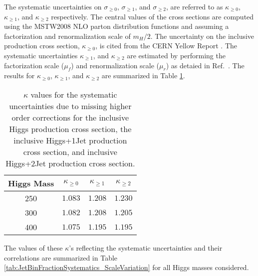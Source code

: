 The systematic uncertainties on $\sigma_{\geq 0}$, $\sigma_{\geq 1}$, and $\sigma_{\geq 2}$, are referred 
to as $\kappa_{\geq 0}$, $\kappa_{\geq 1}$, and $\kappa_{\geq 2}$ respectively. 
The central values of the cross sections are computed  using the MSTW2008 NLO parton distribution functions and 
assuming a factorization and renormalization scale of $m_{H} / 2$. The uncertainty on the inclusive
production cross section, $\kappa_{\geq 0}$, is cited from the CERN Yellow Report 
\cite{LHCHiggsCrossSectionWorkingGroup:2011ti}.  The systematic uncertainties
$\kappa_{\geq 1}$, and $\kappa_{\geq 2}$ are estimated by performing the factorization scale ($\mu_{f}$) 
and renormalization scale ($\mu_{r}$) as detaied in Ref.~\cite{HWW2011AN}. 
The results for $\kappa_{\geq 0}$, $\kappa_{\geq 1}$, and $\kappa_{\geq 2}$ are summarized in Table 
\ref{tab:InclXS_ScaleVariation}.


\begin{table}[!htbp]
\begin{center}
\begin{tabular}{|c|c|c|c|}

\hline
Higgs Mass     &     $\kappa_{\geq 0}$        &   $\kappa_{\geq 1}$        &     $\kappa_{\geq 2}$       \\
\hline
 250 & $ 1.083$  & $ 1.208$  & $ 1.230$  \\
 300 & $ 1.082$  & $ 1.208$  & $ 1.205$  \\
 400 & $ 1.075$  & $ 1.195$  & $ 1.195$  \\
\hline
\end{tabular}
\caption{ $\kappa$ values for the systematic uncertainties due to missing higher order corrections
for the inclusive Higgs production cross section, the inclusive Higgs+1Jet production cross section, 
and inclusive Higgs+2Jet production cross section. }
\label{tab:InclXS_ScaleVariation}
\end{center}
\end{table}

The values of these $\kappa$'s reflecting the systematic uncertainties and their correlations are 
summarized in Table \ref{tab:JetBinFractionSystematics_ScaleVariation} for all Higgs masses considered.


